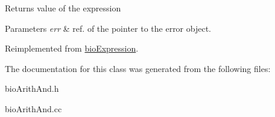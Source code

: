 \begin{DoxyReturn}{Returns}
value of the expression 
\end{DoxyReturn}

\begin{DoxyParams}{Parameters}
{\em err} & ref. of the pointer to the error object. \\
\hline
\end{DoxyParams}


Reimplemented from \hyperlink{classbio_expression_af58662a5d4d456f15bc4f2c9bd4f8a5b}{bio\+Expression}.



The documentation for this class was generated from the following files\+:\begin{DoxyCompactItemize}
\item 
bio\+Arith\+And.\+h\item 
bio\+Arith\+And.\+cc\end{DoxyCompactItemize}
